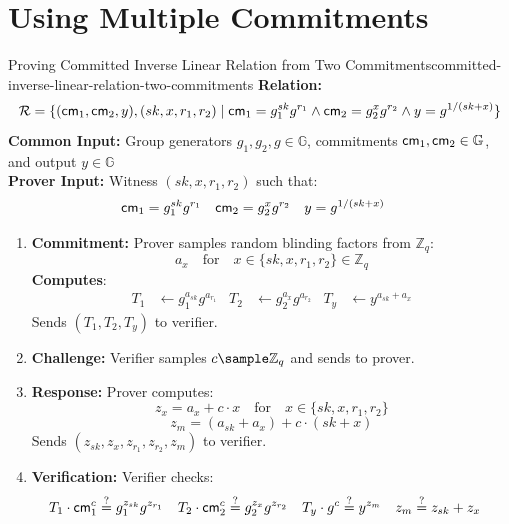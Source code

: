 \section{Using Multiple Commitments}
\begin{protocol}{Proving Committed Inverse Linear Relation from Two Commitments}{committed-inverse-linear-relation-two-commitments}\label{pok-committed-inverse-linear-relation-two-commitments}
\textbf{Relation: }
\[
\mathcal{R} = \{(\mathsf{cm}_1, \mathsf{cm}_2, y), (sk, x, r_1, r_2) \mid \mathsf{cm}_1 = g_1^{sk} g^{r_1} \wedge \mathsf{cm}_2 = g_2^{x} g^{r_2} \wedge y = g^{1/(sk + x)}\}
\]
\textbf{Common Input:} Group generators $g_1, g_2, g \in \mathbb{G}$, commitments $\mathsf{cm}_1, \mathsf{cm}_2 \in \mathbb{G}$, and output $y \in \mathbb{G}$\\
\textbf{Prover Input:} Witness $(sk, x, r_1, r_2)$ such that:
    \begin{align*}
        \mathsf{cm}_1 &= g_1^{sk} g^{r_1} & \mathsf{cm}_2 &= g_2^{x} g^{r_2} & y &= g^{1/(sk + x)}
    \end{align*}
\begin{enumerate}
    \item \textbf{Commitment:} Prover samples random blinding factors from $\mathbb{Z}_q$:
       \[
        a_x \quad \text{for} \quad x \in \{ sk, x, r_1, r_2 \} \in \mathbb{Z}_q
       \]
    \textbf{Computes}:
    \begin{align*}
        T_1 &\gets g_1^{a_{sk}} g^{a_{r_1}} & T_2 &\gets g_2^{a_x} g^{a_{r_2}} & T_y &\gets y^{a_{sk} + a_x}
    \end{align*}
    Sends $(T_1, T_2, T_y)$ to verifier.
    
    \item \textbf{Challenge:} Verifier samples $c \sample \mathbb{Z}_q$ and sends to prover.
    
    \item \textbf{Response:} Prover computes:
    \[
    z_x = a_x + c \cdot x \quad \text{for} \quad x \in \{ sk, x, r_1, r_2 \}
    \]
    \[
    z_m = (a_{sk} + a_x) + c \cdot (sk + x)
    \]
    Sends $(z_{sk}, z_x, z_{r_1}, z_{r_2}, z_m)$ to verifier.
    
    \item \textbf{Verification:} Verifier checks:
    \begin{align*}
        T_1 \cdot \mathsf{cm}_1^c &\stackrel{?}{=} g_1^{z_{sk}} g^{z_{r_1}} &
        T_2 \cdot \mathsf{cm}_2^c &\stackrel{?}{=} g_2^{z_x} g^{z_{r_2}} &
        T_y \cdot g^c &\stackrel{?}{=} y^{z_m} &
        z_m &\stackrel{?}{=} z_{sk} + z_x
    \end{align*}
\end{enumerate}
\end{protocol}







